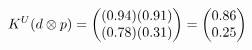 \documentclass[preview]{standalone}
\begin{document}
\begin{align*}
\special{dvisvgm:raw <g id='unique000'>}K^U(d \otimes p) = \begin{pmatrix} (0.94)(0.91) \\ (0.78)(0.31) \end{pmatrix} = \begin{pmatrix} 0.86 \\ 0.25 \end{pmatrix}\special{dvisvgm:raw </g>}
\end{align*}
\end{document}

